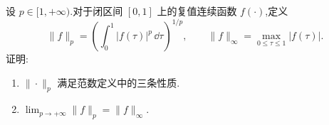 \begin{problem}[选做]
设 $p\in[1,+\infty)$.对于闭区间 $[0,1]$ 上的复值连续函数 $f(\cdot)$,定义
\[
    \|f\|_p=\left(\int_{0}^{1}|f(\tau)|^p\,\dd \tau\right)^{1/p},
    \qquad
    \|f\|_{\infty}=\max_{0\le \tau\le 1}|f(\tau)|.
\]
证明:
\begin{enumerate}
    \item[(1)] $\|\cdot\|_p$ 满足范数定义中的三条性质.
    \item[(2)] $\lim_{p\to+\infty}\|f\|_p=\|f\|_{\infty}$.
\end{enumerate}
\begin{solution}
    
\end{solution}
\end{problem}
